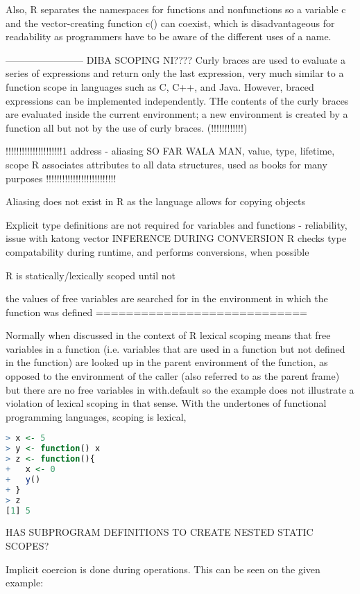 \documentclass[12pt]{article}
\begin{document}
Also, R separates the namespaces for functions and nonfunctions so a variable c and the vector-creating function c() can coexist, which is disadvantageous for readability as programmers have to be aware of the different uses of a name.


------------------------
DIBA SCOPING NI????
Curly braces are used to evaluate a  series of expressions and return only the last expression, very much similar to a function scope in languages such as C, C++, and Java. However, braced expressions can be implemented independently.
THe contents of the curly braces are evaluated inside the current environment; a new environment is created by a function all but not by the use of curly braces. (!!!!!!!!!!!!)

!!!!!!!!!!!!!!!!!!!!!1
address - aliasing SO FAR WALA MAN,
value, type, lifetime, scope
  R associates attributes to all data structures, used as books for many purposes
  !!!!!!!!!!!!!!!!!!!!!!!!!!

Aliasing does not exist in R as the language allows for copying objects

Explicit type definitions are not required for variables and functions
- reliability, issue with katong vector
INFERENCE DURING CONVERSION
  R checks type compatability during runtime, and performs conversions, when possible

  R is statically/lexically scoped until not

  the values of free variables are searched for in the environment in which the function was defined
============================

Normally when discussed in the context of R lexical scoping means that free variables in a function (i.e. variables that are used in a function but not defined in the function) are looked up in the parent environment of the function, as opposed to the environment of the caller (also referred to as the parent frame) but there are no free variables in with.default so the example does not illustrate a violation of lexical scoping in that sense.
  With the undertones of functional programming languages, scoping is lexical,

\begin{lstlisting}[language=R]
> x <- 5
> y <- function() x
> z <- function(){
+   x <- 0
+   y()
+ }
> z
[1] 5
\end{lstlisting}

  HAS SUBPROGRAM DEFINITIONS TO CREATE NESTED STATIC SCOPES?

Implicit coercion is done during operations. This can be seen on the given example:
\end{document}
